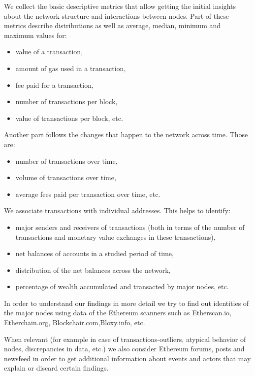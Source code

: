 We collect the basic descriptive metrics that allow getting the initial insights about the network structure and interactions between nodes.
Part of these metrics describe distributions as well as average, median, minimum and maximum values for:
\begin{itemize}
	\item value of a transaction,
	\item amount of gas used in a transaction,
	\item fee paid for a transaction,
	\item number of transactions per block,
	\item value of transactions per block, etc.
\end{itemize}

Another part follows the changes that happen to the network across time. Those are:
\begin{itemize}
	\item number of transactions over time,
	\item volume of transactions over time,
	\item average fees paid per transaction over time, etc.
\end{itemize}

We associate transactions with individual addresses.
This helps to identify:
\begin{itemize}
	\item major senders and receivers of transactions (both in terms of the number of transactions and monetary value exchanges in these transactions),
	\item net balances of accounts in a studied period of time,
	\item distribution of the net balances across the network,
	\item percentage of wealth accumulated and transacted by major nodes, etc.
\end{itemize}

In order to understand our findings in more detail we try to find out identities of the major nodes using data of the Ethereum scanners such as Etherscan.io, Etherchain.org, Blockchair.com,Bloxy.info, etc.

When relevant (for example in case of transactions-outliers, atypical behavior of nodes, discrepancies in data, etc.) we also consider Ethereum forums, posts and newsfeed in order to get additional information about events and actors that may explain or discard certain findings.
